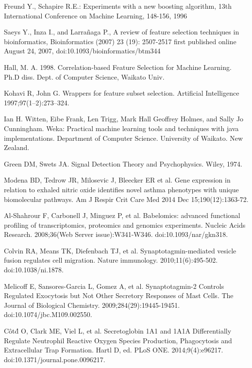 \documentclass[conference,a4paper]{IEEEtran}
\begin{document}
\begin{thebibliography}{1}
	 Freund Y., Schapire R.E.: Experiments with a new boosting algorithm, 13th International Conference on Machine Learning, 148-156, 1996
	
	 Saeys Y., Inza I., and Larra\~naga P., A review of feature selection techniques in bioinformatics, Bioinformatics (2007) 23 (19): 2507-2517 first published online August 24, 2007, doi:10.1093/bioinformatics/btm344
	
	 Hall, M. A. 1998. Correlation-based Feature Selection for Machine Learning. Ph.D diss. Dept. of Computer Science, Waikato Univ.
	
	Kohavi R, John G. Wrappers for feature subset selection. Artificial Intelligence 1997;97(1–2):273–324.
	
	 Ian H. Witten, Eibe Frank, Len Trigg, Mark Hall Geoffrey Holmes, and Sally Jo Cunningham. Weka: Practical machine learning tools and techniques with java implementations. Department of Computer Science. University of Waikato. New Zealand.
	
	 Green DM, Swets JA. Signal Detection Theory and Psychophysics. Wiley, 1974.
	
	 Modena BD, Tedrow JR, Milosevic J, Bleecker ER et al. Gene expression in relation to exhaled nitric oxide identifies novel asthma phenotypes with unique biomolecular pathways. Am J Respir Crit Care Med 2014 Dec 15;190(12):1363-72.
	
	 Al-Shahrour F, Carbonell J, Minguez P, et al. Babelomics: advanced functional profiling of transcriptomics, proteomics and genomics experiments. Nucleic Acids Research. 2008;36(Web Server issue):W341-W346. doi:10.1093/nar/gkn318.
	
	 Colvin RA, Means TK, Diefenbach TJ, et al. Synaptotagmin-mediated vesicle fusion regulates cell migration. Nature immunology. 2010;11(6):495-502. doi:10.1038/ni.1878.
	
	 Melicoff E, Sansores-Garcia L, Gomez A, et al. Synaptotagmin-2 Controls Regulated Exocytosis but Not Other Secretory Responses of Mast Cells. The Journal of Biological Chemistry. 2009;284(29):19445-19451. doi:10.1074/jbc.M109.002550.
	
	 C\^ot\'d O, Clark ME, Viel L, et al. Secretoglobin 1A1 and 1A1A Differentially Regulate Neutrophil Reactive Oxygen Species Production, Phagocytosis and Extracellular Trap Formation. Hartl D, ed. PLoS ONE. 2014;9(4):e96217. doi:10.1371/journal.pone.0096217.
	

\end{thebibliography}
\end{document}
